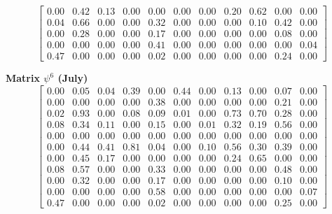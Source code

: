 \documentclass[a4paper,fleqn]{cas-dc}
\begin{document}
\begin{scriptsize}
\[\begin{bmatrix}
0.00 & 0.42 & 0.13 & 0.00 & 0.00 & 0.00 & 0.00 & 0.20 & 0.62 & 0.00 & 0.00\\

0.04 & 0.66 & 0.00 & 0.00 & 0.32 & 0.00 & 0.00 & 0.00 & 0.10 & 0.42 & 0.00\\

0.00 & 0.28 & 0.00 & 0.00 & 0.17 & 0.00 & 0.00 & 0.00 & 0.00 & 0.08 & 0.00\\

0.00 & 0.00 & 0.00 & 0.00 & 0.41 & 0.00 & 0.00 & 0.00 & 0.00 & 0.00 & 0.04\\

0.47 & 0.00 & 0.00 & 0.00 & 0.02 & 0.00 & 0.00 & 0.00 & 0.00 & 0.24 & 0.00

\end{bmatrix}
\]

\textbf{Matrix $\psi^{6}$ (July)}
\[
\begin{bmatrix}

0.00 & 0.05 & 0.04 & 0.39 & 0.00 & 0.44 & 0.00 & 0.13 & 0.00 & 0.07 & 0.00\\

0.00 & 0.00 & 0.00 & 0.00 & 0.38 & 0.00 & 0.00 & 0.00 & 0.00 & 0.21 & 0.00\\

0.02 & 0.93 & 0.00 & 0.08 & 0.09 & 0.01 & 0.00 & 0.73 & 0.70 & 0.28 & 0.00\\

0.08 & 0.34 & 0.11 & 0.00 & 0.15 & 0.00 & 0.01 & 0.32 & 0.19 & 0.56 & 0.00\\

0.00 & 0.00 & 0.00 & 0.00 & 0.00 & 0.00 & 0.00 & 0.00 & 0.00 & 0.00 & 0.00\\

0.00 & 0.44 & 0.41 & 0.81 & 0.04 & 0.00 & 0.10 & 0.56 & 0.30 & 0.39 & 0.00\\

0.00 & 0.45 & 0.17 & 0.00 & 0.00 & 0.00 & 0.00 & 0.24 & 0.65 & 0.00 & 0.00\\

0.08 & 0.57 & 0.00 & 0.00 & 0.33 & 0.00 & 0.00 & 0.00 & 0.00 & 0.48 & 0.00\\

0.00 & 0.32 & 0.00 & 0.00 & 0.17 & 0.00 & 0.00 & 0.00 & 0.00 & 0.10 & 0.00\\

0.00 & 0.00 & 0.00 & 0.00 & 0.58 & 0.00 & 0.00 & 0.00 & 0.00 & 0.00 & 0.07\\

0.47 & 0.00 & 0.00 & 0.00 & 0.02 & 0.00 & 0.00 & 0.00 & 0.00 & 0.25 & 0.00


\end{bmatrix}\]
\end{scriptsize}
\end{document}

